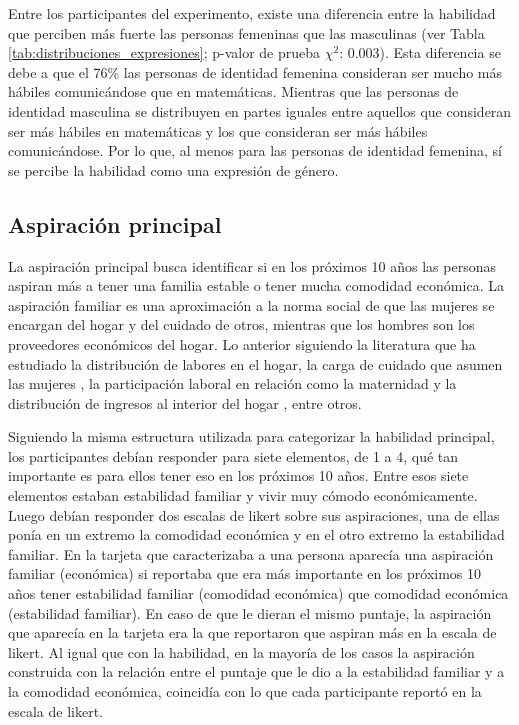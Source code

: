 Entre los participantes del experimento, existe una diferencia entre la habilidad que perciben más fuerte las personas femeninas que las masculinas (ver Tabla \ref{tab:distribuciones_expresiones}; p-valor de prueba $\chi^2$: 0.003). Esta diferencia se debe a que el 76\% las personas de identidad femenina consideran ser mucho más hábiles comunicándose que en matemáticas. Mientras que las personas de identidad masculina se distribuyen en partes iguales entre aquellos que consideran ser más hábiles en matemáticas y los que consideran ser más hábiles comunicándose. Por lo que, al menos para las personas de identidad femenina, sí se percibe la habilidad como una expresión de género. 

\subsection{Aspiración principal} 
La aspiración principal busca identificar si en los próximos 10 años las personas aspiran más a tener una familia estable o tener mucha comodidad económica. La aspiración familiar es una aproximación a la norma social de que las mujeres se encargan del hogar y del cuidado de otros, mientras que los hombres son los proveedores económicos del hogar. Lo anterior siguiendo la literatura que ha estudiado la distribución de labores en el hogar, la carga de cuidado que asumen las mujeres \citep{floro1995gendertimeallocation, urdinola2017timeusegender}, la participación laboral en relación como la maternidad \citep{lundborg2017childrencareer}  y la distribución de ingresos al interior del hogar \citep{bertrand2015genderandincome, Robinson2012incomeallocationandshocks}, entre otros. 

Siguiendo la misma estructura utilizada para categorizar la habilidad principal,  los participantes debían responder para siete elementos, de 1 a 4,  qué tan importante es para ellos tener eso en los próximos 10 años. Entre esos siete elementos estaban estabilidad familiar y vivir muy cómodo económicamente. Luego debían responder dos escalas de likert sobre sus aspiraciones, una de ellas ponía en un extremo la comodidad económica y en el otro extremo la estabilidad familiar. En la tarjeta que caracterizaba a una persona aparecía una aspiración familiar (económica) si reportaba que era más importante en los próximos 10 años tener estabilidad familiar (comodidad económica) que comodidad económica (estabilidad familiar). En caso de que le dieran el mismo puntaje, la aspiración que aparecía en la tarjeta era la que reportaron que aspiran más en la escala de likert. Al igual que con la habilidad, en la mayoría de los casos la aspiración construida con la relación entre el puntaje que le dio a la estabilidad familiar y a la comodidad económica, coincidía con lo que cada participante reportó en la escala de likert. 

